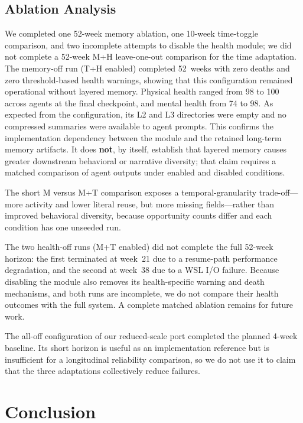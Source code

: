 \documentclass[11pt]{article}
\begin{document}
\subsection{Ablation Analysis}

We completed one 52-week memory ablation, one 10-week time-toggle comparison, and two incomplete attempts to disable the health module; we did not complete a 52-week M+H leave-one-out comparison for the time adaptation.
The memory-off run (T+H enabled) completed 52~weeks with zero deaths and zero threshold-based health warnings, showing that this configuration remained operational without layered memory. Physical health ranged from 98 to 100 across agents at the final checkpoint, and mental health from 74 to 98. As expected from the configuration, its L2 and L3 directories were empty and no compressed summaries were available to agent prompts. This confirms the implementation dependency between the module and the retained long-term memory artifacts. It does \textbf{not}, by itself, establish that layered memory causes greater downstream behavioral or narrative diversity; that claim requires a matched comparison of agent outputs under enabled and disabled conditions.

The short M versus M+T comparison exposes a temporal-granularity trade-off---more activity and lower literal reuse, but more missing fields---rather than improved behavioral diversity, because opportunity counts differ and each condition has one unseeded run.

The two health-off runs (M+T enabled) did not complete the full 52-week horizon: the first terminated at week~21 due to a resume-path performance degradation, and the second at week~38 due to a WSL I/O failure. Because disabling the module also removes its health-specific warning and death mechanisms, and both runs are incomplete, we do not compare their health outcomes with the full system. A complete matched ablation remains for future work.

The all-off configuration of our reduced-scale port completed the planned 4-week baseline. Its short horizon is useful as an implementation reference but is insufficient for a longitudinal reliability comparison, so we do not use it to claim that the three adaptations collectively reduce failures.

\section{Conclusion}
\end{document}
